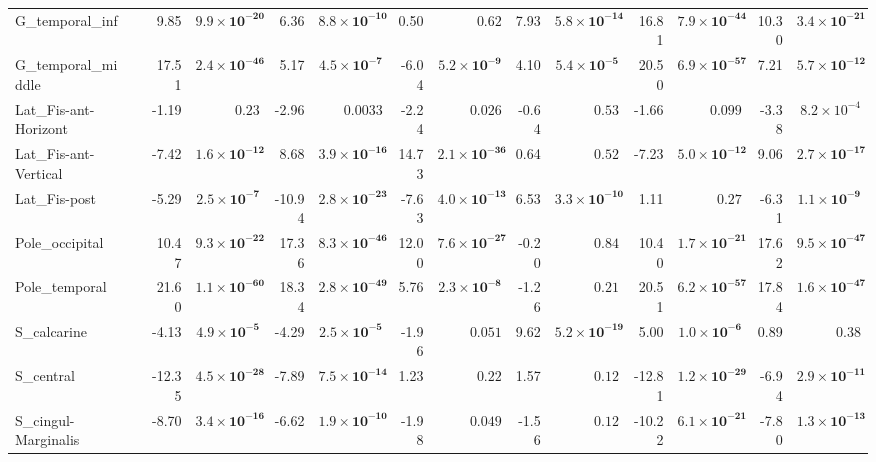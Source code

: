 {\begin{longtable}{llrrrrrrrrrrrr}
G\_temporal\_inf &  & 9.85 & $\mathbf{9.9{\times}10^{-20}}$ & 6.36 & $\mathbf{8.8{\times}10^{-10}}$ & 0.50 & $0.62$ & 7.93 & $\mathbf{5.8{\times}10^{-14}}$ & 16.81 & $\mathbf{7.9{\times}10^{-44}}$ & 10.30 & $\mathbf{3.4{\times}10^{-21}}$ \\
G\_temporal\_middle &  & 17.51 & $\mathbf{2.4{\times}10^{-46}}$ & 5.17 & $\mathbf{4.5{\times}10^{-7}}$ & -6.04 & $\mathbf{5.2{\times}10^{-9}}$ & 4.10 & $\mathbf{5.4{\times}10^{-5}}$ & 20.50 & $\mathbf{6.9{\times}10^{-57}}$ & 7.21 & $\mathbf{5.7{\times}10^{-12}}$ \\
Lat\_Fis-ant-Horizont &  & -1.19 & $0.23$ & -2.96 & $0.0033$ & -2.24 & $0.026$ & -0.64 & $0.53$ & -1.66 & $0.099$ & -3.38 & $8.2{\times}10^{-4}$ \\
Lat\_Fis-ant-Vertical &  & -7.42 & $\mathbf{1.6{\times}10^{-12}}$ & 8.68 & $\mathbf{3.9{\times}10^{-16}}$ & 14.73 & $\mathbf{2.1{\times}10^{-36}}$ & 0.64 & $0.52$ & -7.23 & $\mathbf{5.0{\times}10^{-12}}$ & 9.06 & $\mathbf{2.7{\times}10^{-17}}$ \\
Lat\_Fis-post &  & -5.29 & $\mathbf{2.5{\times}10^{-7}}$ & -10.94 & $\mathbf{2.8{\times}10^{-23}}$ & -7.63 & $\mathbf{4.0{\times}10^{-13}}$ & 6.53 & $\mathbf{3.3{\times}10^{-10}}$ & 1.11 & $0.27$ & -6.31 & $\mathbf{1.1{\times}10^{-9}}$ \\
Pole\_occipital &  & 10.47 & $\mathbf{9.3{\times}10^{-22}}$ & 17.36 & $\mathbf{8.3{\times}10^{-46}}$ & 12.00 & $\mathbf{7.6{\times}10^{-27}}$ & -0.20 & $0.84$ & 10.40 & $\mathbf{1.7{\times}10^{-21}}$ & 17.62 & $\mathbf{9.5{\times}10^{-47}}$ \\
Pole\_temporal &  & 21.60 & $\mathbf{1.1{\times}10^{-60}}$ & 18.34 & $\mathbf{2.8{\times}10^{-49}}$ & 5.76 & $\mathbf{2.3{\times}10^{-8}}$ & -1.26 & $0.21$ & 20.51 & $\mathbf{6.2{\times}10^{-57}}$ & 17.84 & $\mathbf{1.6{\times}10^{-47}}$ \\
S\_calcarine &  & -4.13 & $\mathbf{4.9{\times}10^{-5}}$ & -4.29 & $\mathbf{2.5{\times}10^{-5}}$ & -1.96 & $0.051$ & 9.62 & $\mathbf{5.2{\times}10^{-19}}$ & 5.00 & $\mathbf{1.0{\times}10^{-6}}$ & 0.89 & $0.38$ \\
S\_central &  & -12.35 & $\mathbf{4.5{\times}10^{-28}}$ & -7.89 & $\mathbf{7.5{\times}10^{-14}}$ & 1.23 & $0.22$ & 1.57 & $0.12$ & -12.81 & $\mathbf{1.2{\times}10^{-29}}$ & -6.94 & $\mathbf{2.9{\times}10^{-11}}$ \\
S\_cingul-Marginalis &  & -8.70 & $\mathbf{3.4{\times}10^{-16}}$ & -6.62 & $\mathbf{1.9{\times}10^{-10}}$ & -1.98 & $0.049$ & -1.56 & $0.12$ & -10.22 & $\mathbf{6.1{\times}10^{-21}}$ & -7.80 & $\mathbf{1.3{\times}10^{-13}}$ \\

\end{longtable}}
